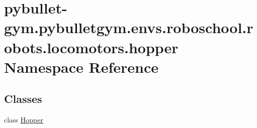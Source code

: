 \hypertarget{namespacepybullet-gym_1_1pybulletgym_1_1envs_1_1roboschool_1_1robots_1_1locomotors_1_1hopper}{}\section{pybullet-\/gym.pybulletgym.\+envs.\+roboschool.\+robots.\+locomotors.\+hopper Namespace Reference}
\label{namespacepybullet-gym_1_1pybulletgym_1_1envs_1_1roboschool_1_1robots_1_1locomotors_1_1hopper}
\subsection*{Classes}
\begin{DoxyCompactItemize}
\item 
class \hyperlink{classpybullet-gym_1_1pybulletgym_1_1envs_1_1roboschool_1_1robots_1_1locomotors_1_1hopper_1_1_hopper}{Hopper}
\end{DoxyCompactItemize}

